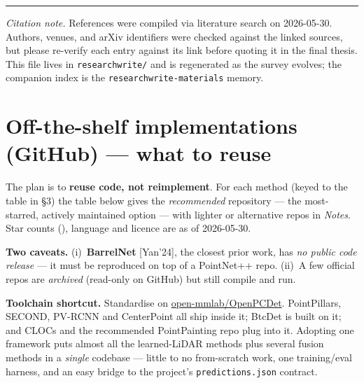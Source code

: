 \documentclass[10pt,a4paper]{article}
\begin{document}
\vspace{6pt}
\hrule
\vspace{4pt}
{\footnotesize\emph{Citation note.} References were compiled via literature search on
2026-05-30. Authors, venues, and arXiv identifiers were checked against the linked
sources, but please re-verify each entry against its link before quoting it in the final
thesis. This file lives in \texttt{researchwrite/} and is regenerated as the survey
evolves; the companion index is the \texttt{researchwrite-materials} memory.}

\clearpage
\section{Off-the-shelf implementations (GitHub) --- what to reuse}

The plan is to \textbf{reuse code, not reimplement}. For each method (keyed to the table
in \S3) the table below gives the \emph{recommended} repository --- the most-starred,
actively maintained option --- with lighter or alternative repos in \emph{Notes}. Star
counts (), language and licence are as of 2026-05-30.

\textbf{Two caveats.} (i)~\textbf{BarrelNet} [Yan'24], the closest prior work, has
\emph{no public code release} --- it must be reproduced on top of a PointNet++ repo.
(ii)~A few official repos are \emph{archived} (read-only on GitHub) but still compile and
run.

\vspace{4pt}
\noindent\colorbox{cH!55}{%
\begin{minipage}{\dimexpr\textwidth-2\fboxsep\relax}
\textbf{Toolchain shortcut.}\; Standardise on
\href{https://github.com/open-mmlab/OpenPCDet}{open-mmlab/OpenPCDet}. PointPillars,
SECOND, PV-RCNN and CenterPoint all ship inside it; BtcDet is built on it; and CLOCs and
the recommended PointPainting repo plug into it. Adopting one framework puts almost all
the learned-LiDAR methods plus several fusion methods in a \emph{single} codebase --- little
to no from-scratch work, one training/eval harness, and an easy bridge to the project's
\texttt{predictions.json} contract.
\end{minipage}}
\end{document}
